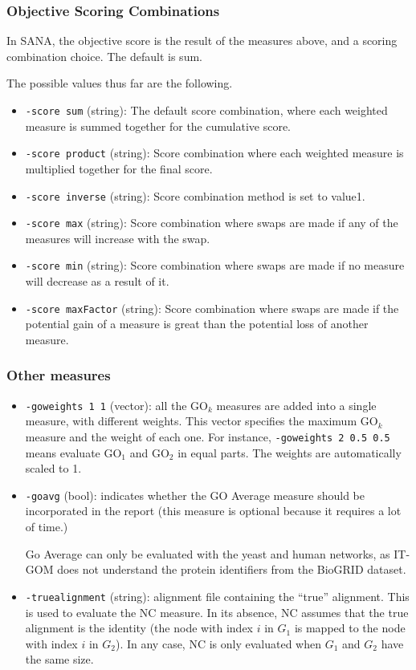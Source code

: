 \documentclass[]{article}
\begin{document}
\subsubsection*{Objective Scoring Combinations}
In SANA, the objective score is the result of the measures above, and a scoring combination choice. The default is sum.

The possible values thus far are the following.
\begin{itemize}
\item\texttt{-score sum} (string): The default score combination, where each weighted measure is summed together for the cumulative score.
\item\texttt{-score product} (string): Score combination where each weighted measure is multiplied together for the final score.
\item\texttt{-score inverse} (string): Score combination method is set to value1.
\item\texttt{-score max} (string): Score combination where swaps are made if any of the measures will increase with the swap.
\item\texttt{-score min} (string): Score combination where swaps are made if no measure will decrease as a result of it.
\item\texttt{-score maxFactor} (string): Score combination where swaps are made if the potential gain of a measure is great than the potential loss of another measure.
\end{itemize}
\subsubsection*{Other measures}
\begin{itemize}
\item\texttt{-goweights 1 1} (vector): all the $\mbox{GO}_k$ measures are added into a single measure, with different weights. This vector specifies the maximum $\mbox{GO}_k$ measure and the weight of each one. For instance, \texttt{-goweights 2 0.5 0.5} means evaluate $\mbox{GO}_1$ and $\mbox{GO}_2$ in equal parts. The weights are automatically scaled to 1.
\item\texttt{-goavg} (bool): indicates whether the GO Average measure should be incorporated in the report (this measure is optional because it requires a lot of time.)

Go Average can only be evaluated with the yeast and human networks, as IT-GOM does not understand the protein identifiers from the BioGRID dataset.
\item\texttt{-truealignment} (string): alignment file containing the ``true'' alignment. This is used to evaluate the NC measure. In its absence, NC assumes that the true alignment is the identity (the node with index $i$ in $G_1$ is mapped to the node with index $i$ in $G_2$). In any case, NC is only evaluated when $G_1$ and $G_2$ have the same size.
\end{itemize}
\end{document}
